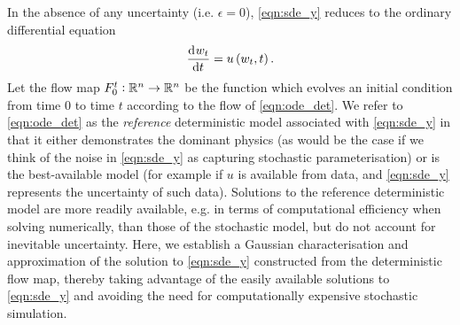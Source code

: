 In the absence of any uncertainty (i.e. \(\epsilon = 0\)), \eqref{eqn:sde_y} reduces to the ordinary differential equation
\begin{equation}
	\dod{w_t}{t} = u\left(w_t, t\right).
	\label{eqn:ode_det}
\end{equation}
Let the flow map \(F_{0}^{t}: \mathbb{R}^n \to \mathbb{R}^n\) be the function which evolves an initial condition from time \(0\) to time \(t\) according to the flow of \eqref{eqn:ode_det}.
We refer to \eqref{eqn:ode_det} as the \emph{reference} deterministic model associated with \eqref{eqn:sde_y} in that
it either demonstrates the dominant physics (as would be the case if we think of the noise in \eqref{eqn:sde_y} as
capturing stochastic parameterisation) or is the best-available model (for example if $ u $ is available from data, and \eqref{eqn:sde_y} represents the uncertainty of such data).
Solutions to the reference deterministic model are more readily available, e.g. in terms of computational efficiency when solving numerically, than those of the stochastic model, but do not account for inevitable uncertainty.
Here, we establish a Gaussian characterisation and approximation of the solution to \eqref{eqn:sde_y} constructed from the deterministic flow map, thereby taking advantage of the easily available solutions to \eqref{eqn:sde_y} and avoiding the need for computationally expensive stochastic simulation.








